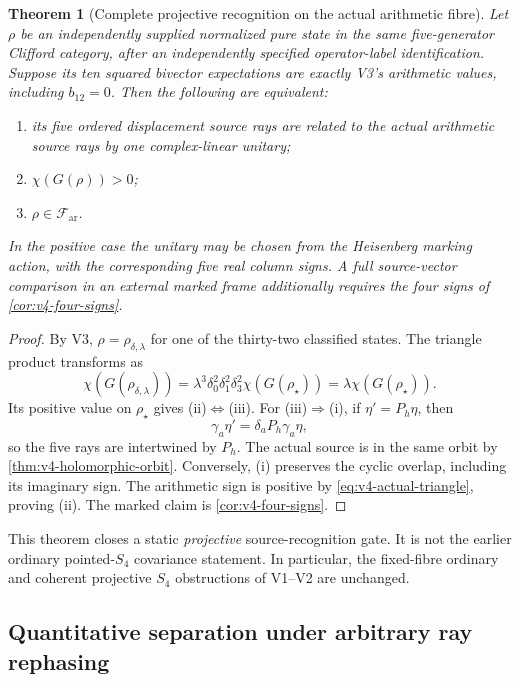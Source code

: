 \documentclass[11pt]{article}
\newtheorem{theorem}{Theorem}[section]
\theoremstyle{definition}
\theoremstyle{remark}
\begin{document}
\begin{theorem}[Complete projective recognition on the actual arithmetic fibre]
\label{thm:v4-projective-test}
Let $\rho$ be an independently supplied normalized pure state in the same
five-generator Clifford category, after an independently specified
operator-label identification. Suppose its ten squared bivector
expectations are exactly V3's arithmetic values, including $b_{12}=0$.
Then the following are equivalent:
\begin{enumerate}[label=\textup{(\roman*)},leftmargin=2.8em]
\item its five ordered displacement source rays are related to the actual
      arithmetic source rays by one complex-linear unitary;
\item $\chi(G(\rho))>0$;
\item $\rho\in\mathcal F_{\mathrm{ar}}$.
\end{enumerate}
In the positive case the unitary may be chosen from the Heisenberg marking
action, with the corresponding five real column signs. A full
source-\emph{vector} comparison in an external marked frame additionally
requires the four signs of \cref{cor:v4-four-signs}.
\end{theorem}
\begin{proof}
By V3, $\rho=\rho_{\delta,\lambda}$ for one of the thirty-two classified
states. The triangle product transforms as
\[
 \chi(G(\rho_{\delta,\lambda}))
 =\lambda^3\delta_0^2\delta_1^2\delta_3^2\chi(G(\rho_\star))
 =\lambda\chi(G(\rho_\star)).
\]
Its positive value on $\rho_\star$ gives (ii)$\Leftrightarrow$(iii).
For (iii)$\Rightarrow$(i), if $\eta'=P_h\eta$, then
\[
 \gamma_a\eta'=\delta_aP_h\gamma_a\eta,
\]
so the five rays are intertwined by $P_h$. The actual source is in the
same orbit by \cref{thm:v4-holomorphic-orbit}. Conversely, (i) preserves
the cyclic overlap, including its imaginary sign. The arithmetic sign is
positive by \eqref{eq:v4-actual-triangle}, proving (ii). The marked claim
is \cref{cor:v4-four-signs}.
\end{proof}

This theorem closes a static \emph{projective} source-recognition gate.
It is not the earlier ordinary pointed-$S_4$ covariance statement. In
particular, the fixed-fibre ordinary and coherent projective $S_4$
obstructions of V1--V2 are unchanged.

\subsection{Quantitative separation under arbitrary ray rephasing}
\end{document}
